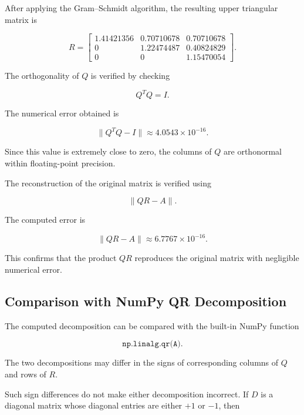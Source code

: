 \documentclass[12pt,a4paper]{article}
\numberwithin{equation}{section}
\begin{document}
After applying the Gram--Schmidt algorithm, the
resulting upper triangular matrix is

\begin{equation}
R=
\begin{bmatrix}
1.41421356&0.70710678&0.70710678\\
0&1.22474487&0.40824829\\
0&0&1.15470054
\end{bmatrix}.
\end{equation}

The orthogonality of $Q$ is verified by checking

\begin{equation}
Q^TQ=I.
\end{equation}

The numerical error obtained is

\begin{equation}
\|Q^TQ-I\|
\approx 4.0543\times10^{-16}.
\end{equation}

Since this value is extremely close to zero,
the columns of $Q$ are orthonormal within
floating-point precision.

The reconstruction of the original matrix is
verified using

\begin{equation}
\|QR-A\|.
\end{equation}

The computed error is

\begin{equation}
\|QR-A\|
\approx 6.7767\times10^{-16}.
\end{equation}

This confirms that the product $QR$ reproduces
the original matrix with negligible numerical error.

\subsection{Comparison with NumPy QR Decomposition}

The computed decomposition can be compared with
the built-in NumPy function

\begin{equation}
\texttt{np.linalg.qr(A)}.
\end{equation}

The two decompositions may differ in the signs
of corresponding columns of $Q$ and rows of $R$.

Such sign differences do not make either
decomposition incorrect. If $D$ is a diagonal
matrix whose diagonal entries are either $+1$
or $-1$, then
\end{document}
